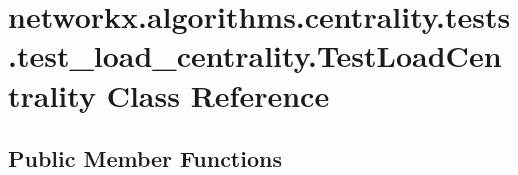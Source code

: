 \hypertarget{classnetworkx_1_1algorithms_1_1centrality_1_1tests_1_1test__load__centrality_1_1TestLoadCentrality}{}\section{networkx.\+algorithms.\+centrality.\+tests.\+test\+\_\+load\+\_\+centrality.\+Test\+Load\+Centrality Class Reference}
\label{classnetworkx_1_1algorithms_1_1centrality_1_1tests_1_1test__load__centrality_1_1TestLoadCentrality}
\subsection*{Public Member Functions}

